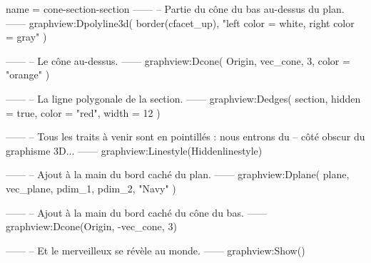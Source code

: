 \documentclass{standalone}
\begin{document}
\begin{luadraw}{name = cone-section-section}
------
-- Partie du cône du bas au-dessus du plan.
------
graphview:Dpolyline3d(
  border(cfacet_up),
  "left color = white, right color = gray"
)

------
-- Le cône au-dessus.
------
graphview:Dcone(
  Origin, vec_cone, 3,
  {
    color = "orange"
  })

------
-- La ligne polygonale de la section.
------
graphview:Dedges(
  section,
  {
    hidden = true, color = "red", width = 12
  })

------
-- Tous les traits à venir sont en pointillés : nous entrons du
-- côté obscur du graphisme 3D...
------
graphview:Linestyle(Hiddenlinestyle)

------
-- Ajout à la main du bord caché du plan.
------
graphview:Dplane(
  plane,
  vec_plane, pdim_1, pdim_2,
  "Navy"
)

------
-- Ajout à la main du bord caché du cône du bas.
------
graphview:Dcone(Origin, -vec_cone, 3)

------
-- Et le merveilleux se révèle au monde.
------
graphview:Show()
\end{luadraw}
\end{document}
